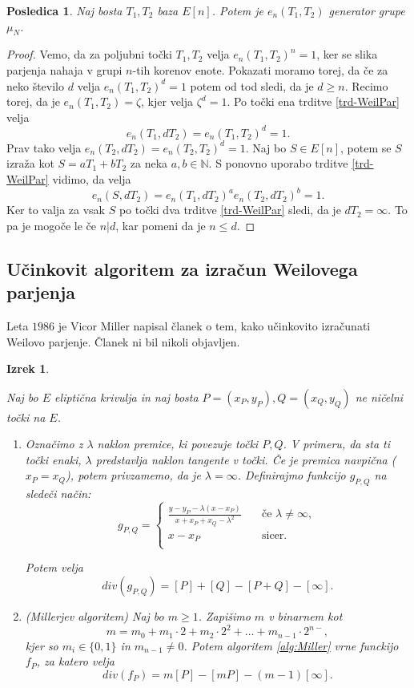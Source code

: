 \documentclass[12pt,a4paper,twoside]{article}
\theoremstyle{definition} %
\theoremstyle{plain} %
\newtheorem{izrek}[definicija]{Izrek}
\newtheorem{posledica}[definicija]{Posledica}
\numberwithin{equation}{section}  %
\newcommand{\N}{\mathbb N}
\begin{document}
\begin{posledica}
\label{PosledicaTrdParj}
Naj bosta $T_1,T_2$ baza $E[n]$. Potem je $e_n(T_1,T_2)$ generator grupe $\mu_N$.
\end{posledica}

\begin{proof}
Vemo, da za poljubni točki $T_1,T_2$ velja $e_n(T_1,T_2)^n = 1$, ker se slika parjenja nahaja v grupi $n$-tih korenov enote. Pokazati moramo torej, da če za neko število $d$ velja  $e_n(T_1,T_2)^d = 1$ potem od tod sledi, da je $d \geq n$.
Recimo torej, da je $e_n(T_1,T_2) = \zeta$, kjer velja $\zeta^d = 1$.
Po točki ena trditve \ref{trd-WeilPar} velja $$e_n(T_1,dT_2) = e_n(T_1,T_2)^d=1.$$ Prav tako velja $e_n(T_2,dT_2) = e_n(T_2,T_2)^d = 1 $. Naj bo $S \in E[n]$, potem se $S$ izraža kot $S = aT_1+bT_2$ za neka $a,b \in \N$.
S ponovno uporabo trditve \ref{trd-WeilPar} vidimo, da velja
$$e_n(S,dT_2)= e_n(T_1,dT_2)^ae_n(T_2,dT_2)^b = 1. $$
Ker to valja za vsak $S$ po točki dva trditve \ref{trd-WeilPar} sledi, da je $dT_2 = \infty$. To pa je mogoče le če $n|d$, kar pomeni da je $n \leq d$.
\end{proof}

\subsection{Učinkovit algoritem za izračun Weilovega parjenja}

Leta $1986$ je Vicor Miller napisal članek o tem, kako učinkovito izračunati Weilovo parjenje. Članek ni bil nikoli objavljen.

\begin{izrek}
\label{izrek:Miller}

Naj bo $E$ eliptična krivulja in naj bosta $P=(x_P,y_P), Q = (x_Q,y_Q)$ ne ničelni točki na $E$.
\begin{enumerate}
\item Označimo z $\lambda$ naklon premice, ki povezuje točki $P,Q$. V primeru, da sta ti točki enaki, $\lambda$ predstavlja naklon tangente v točki. Če je premica navpična ($x_P = x_Q$), potem privzamemo, da je $\lambda = \infty$. Definirajmo funkcijo $g_{P,Q}$ na sledeči način:
\[ g_{P,Q} =
\begin{cases}
\frac{y-y_P-\lambda(x-x_P)}{x+x_P+x_Q-\lambda^2} & \quad \text{če } \lambda \neq \infty ,\\
x-x_P & \quad \text{sicer} .\\
\end{cases}
\]

Potem velja 
$$div(g_{P,Q}) = [P] + [Q] - [P+Q] - [\infty].$$


\item (Millerjev algoritem) Naj bo $m \geq 1$. Zapišimo $m$ v binarnem kot
$$m = m_0+m_1\cdot 2 + m_2\cdot 2^2 + \ldots + m_{n-1}\cdot 2^{n-},$$
kjer so $m_i \in \{ 0,1 \}$ in $m_{n-1} \neq 0$. Potem algoritem \ref{alg:Miller} vrne
funckijo $f_P$, za katero velja
$$div(f_P) = m[P]-[mP]-(m-1)[\infty].$$ 


\end{enumerate}


\end{izrek}
\end{document}
